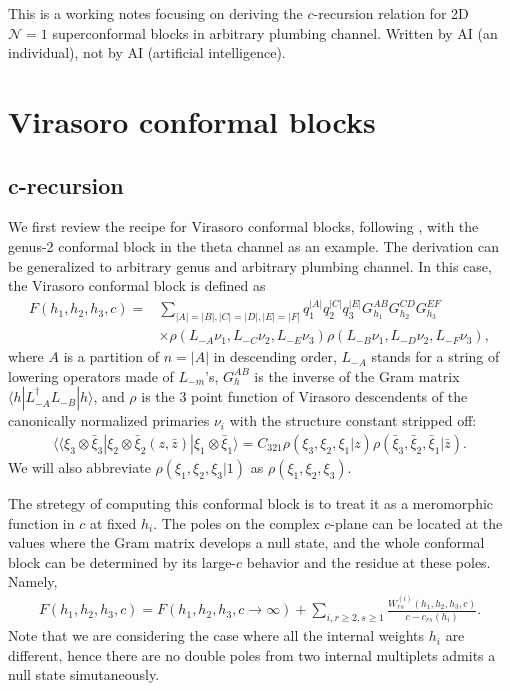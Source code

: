 \documentclass[12pt]{article}
\newcommand{\ie}{\begin{equation}\begin{aligned}}
\newcommand{\fe}{\end{aligned}\end{equation}}
\numberwithin{equation}{section}
\begin{document}
This is a working notes focusing on deriving the $c$-recursion relation for 2D $\mathcal{N}=1$ superconformal blocks in arbitrary plumbing channel. Written by AI (an individual), not by AI (artificial intelligence).



\section{Virasoro conformal blocks}

\subsection{c-recursion}

We first review the recipe for Virasoro conformal blocks, following \cite{Cho-Collier-Yin}, with the genus-2 conformal block in the theta channel as an example. The derivation can be generalized to arbitrary genus and arbitrary plumbing channel. In this case, the Virasoro conformal block is defined as
\ie
F\left(h_1, h_2, h_3, c\right)= & \sum_{|A|=|B|,|C|=|D|,|E|=|F|} q_1^{|A|} q_2^{|C|} q_3^{|E|} G_{h_1}^{A B} G_{h_2}^{C D} G_{h_3}^{E F} \\
& \times \rho\left(L_{-A} \nu_1, L_{-C} \nu_2, L_{-E} \nu_3\right) \rho\left(L_{-B} \nu_1, L_{-D} \nu_2, L_{-F} \nu_3\right) ,
\fe
where $A$ is a partition of $n=|A|$ in descending order, $L_{-A}$ stands for a string of lowering operators made of $L_{-m}$'s, $G^{AB}_h$ is the inverse of the Gram matrix $\langle h|L_{-A}^\dagger L_{-B} |h \rangle$, and $\rho$ is the 3 point function of Virasoro descendents of the canonically normalized primaries $\nu_i$ with the structure constant stripped off:
\ie \label{rho}
\langle\langle\xi_3 \otimes \bar{\xi}_3| \xi_2\otimes \bar{\xi}_2(z, \bar{z})|\xi_1 \otimes \bar{\xi}_1\rangle=C_{321} \rho\left(\xi_3, \xi_2, \xi_1| z\right) \rho\left(\bar{\xi}_3, \bar{\xi}_2, \bar{\xi}_1 | \bar{z}\right).
\fe
We will also abbreviate $\rho(\xi_1, \xi_2, \xi_3|1)$ as $\rho(\xi_1, \xi_2, \xi_3)$.

The stretegy of computing this conformal block is to treat it as a meromorphic function in $c$ at fixed $h_i$. The poles on the complex $c$-plane can be located at the values where the Gram matrix develops a null state, and the whole conformal block can be determined by its large-$c$ behavior and the residue at these poles. Namely,
\ie
F(h_1,h_2, h_3,c) = F(h_1,h_2, h_3,c\rightarrow \infty) + \sum_{i, r\geq 2, s\geq 1} \frac{W_{rs}^{(i)}(h_1, h_2, h_3, c)}{c-c_{rs}(h_i)}.
\fe
Note that we are considering the case where all the internal weights $h_i$ are different, hence there are no double poles from two internal multiplets admits a null state simutaneously.
\end{document}
